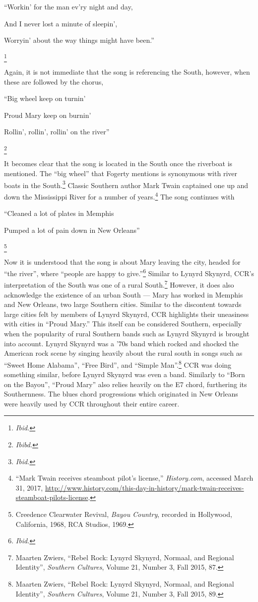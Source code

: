\documentclass[10pt]{article}
\begin{document}
\singlespacing
{\small ``Workin' for the man ev'ry night and day,

And I never lost a minute of sleepin',

Worryin' about the way things might have been.''}\footnote{\textit{Ibid.}}

\doublespacing
\noindent Again, it is not immediate that the song is referencing the South, however, when these are followed by the chorus,

\singlespacing
{\small ``Big wheel keep on turnin'

Proud Mary keep on burnin'

Rollin', rollin', rollin' on the river''}\footnote{\textit{Ibibd.}}

\doublespacing
\noindent It becomes clear that the song is located in the South once the riverboat is mentioned. The ``big wheel'' that Fogerty mentions is synonymous with river boats in the South.\footnote{\textit{Ibid.}} Classic Southern author Mark Twain captained one up and down the Mississippi River for a number of years.\footnote{``Mark Twain receives steamboat pilot's license,'' \textit{History.com}, accessed March 31, 2017, \url{http://www.history.com/this-day-in-history/mark-twain-receives-steamboat-pilots-license}.} The song continues with 

\singlespacing
{\small ``Cleaned a lot of plates in Memphis

Pumped a lot of pain down in New Orleans''}\footnote{Creedence Clearwater Revival, \textit{Bayou Country}, recorded in Hollywood, California, 1968, RCA Studios, 1969.}

\doublespacing
\noindent Now it is understood that the song is about Mary leaving the city, headed for ``the river'', where ``people are happy to give.''\footnote{\textit{Ibid.}} Similar to Lynyrd Skynyrd, CCR's interpretation of the South was one of a rural South.\footnote{Maarten Zwiers, ``Rebel Rock: Lynyrd Skynyrd, Normaal, and Regional Identity'', \textit{Southern Cultures}, Volume 21, Number 3, Fall 2015, 87.} However, it does also acknowledge the existence of an urban South --- Mary has worked in Memphis and New Orleans, two large Southern cities. Similar to the discontent towards large cities felt by members of Lynyrd Skynyrd, CCR highlights their uneasiness with cities in ``Proud Mary.'' This itself can be considered Southern, especially when the popularity of rural Southern bands such as Lynyrd Skynyrd is brought into account. Lynyrd Skynyrd was a '70s band which rocked and shocked the American rock scene by singing heavily about the rural south in songs such as ``Sweet Home Alabama'', ``Free Bird'', and ``Simple Man''.\footnote{Maarten Zwiers, ``Rebel Rock: Lynyrd Skynyrd, Normaal, and Regional Identity'', \textit{Southern Cultures}, Volume 21, Number 3, Fall 2015, 89.} CCR was doing something similar, before Lynyrd Skynyrd was even a band. Similarly to ``Born on the Bayou'', ``Proud Mary'' also relies heavily on the E7 chord, furthering its Southernness. The blues chord progressions which originated in New Orleans were heavily used by CCR throughout their entire career.
\end{document}
